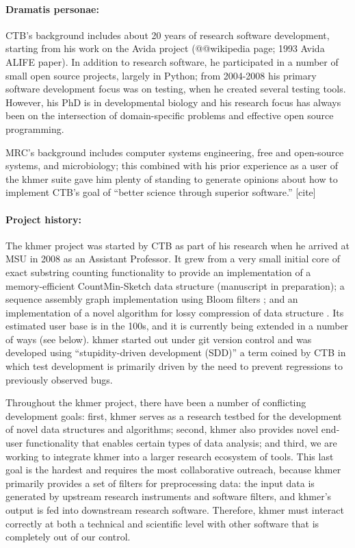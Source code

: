 \documentclass[11pt]{article}
\begin{document}
\paragraph{Dramatis personae:}
CTB's background includes about 20 years of research software
development, starting from his work on the Avida project (@@wikipedia
page; 1993 Avida ALIFE paper).  In addition to research software, he
participated in a number of small open source projects, largely in
Python; from 2004-2008 his primary software development focus was on
testing, when he created several testing tools.  However, his PhD is
in developmental biology and his research focus has always been on the
intersection of domain-specific problems and effective open source
programming.

MRC's background includes computer systems engineering, free and
open-source systems, and microbiology; this combined with his prior
experience as a user of the khmer suite gave him plenty of standing to
generate opinions about how to implement CTB's goal of ``better
science through superior software.''  [cite]

\paragraph{Project history:}
The khmer project was started by CTB as part of his research when he
arrived at MSU in 2008 as an Assistant Professor.  It grew from a very
small initial core of exact substring counting functionality to
provide an implementation of a memory-efficient CountMin-Sketch data
structure (manuscript in preparation); a sequence assembly graph
implementation using Bloom filters \cite{kmer-percolation}; and an
implementation of a novel algorithm for lossy compression of data
structure \cite{diginorm}.  Its estimated user base is in the 100s,
and it is currently being extended in a number of ways (see below).
khmer started out under git version control and was developed using
``stupidity-driven development (SDD)'' a term coined by CTB in which test
development is primarily driven by the need to prevent regressions to
previously observed bugs.

Throughout the khmer project, there have been a number of conflicting
development goals: first, khmer serves as a research testbed for the
development of novel data structures and algorithms; second, khmer
also provides novel end-user functionality that enables certain types
of data analysis; and third, we are working to integrate khmer into a
larger research ecosystem of tools.  This last goal is the hardest
and requires the most collaborative outreach, because khmer
primarily provides a set of filters for preprocessing data: the input
data is generated by upstream research instruments and software
filters, and khmer's output is fed into downstream research software.
Therefore, khmer must interact correctly at both a technical and
scientific level with other software that is completely out of our
control.
\end{document}
